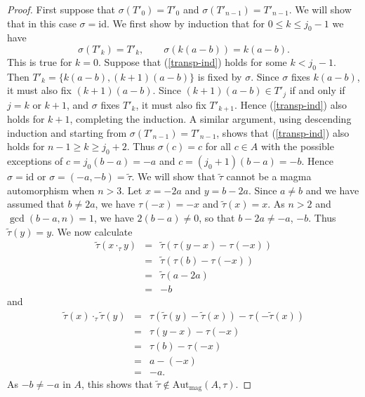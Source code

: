 \documentclass[10pt,a4paper]{amsart}
\numberwithin{equation}{section}
\theoremstyle{definition}
\newcommand{\id}{\mathrm{id}}
\newcommand{\Autmag}{\mathrm{Aut}_\mathrm{mag}}
\newcommand{\ttau}{\tilde{\tau}}
\begin{document}
\begin{proof}
First suppose that $\sigma(T'_0)=T'_0$ and $\sigma(T'_{n-1}) = T'_{n-1}$. We will show that in this case $\sigma=\id$.
We first show by induction that for $0 \leq k \leq j_0-1$ we have 
\begin{equation} \label{transp-ind}
	\sigma(T'_k)=T'_k, \qquad \sigma(k(a-b))=k(a-b).
\end{equation}
This is true for $k=0$. Suppose that (\ref{transp-ind}) holds for some $k<j_0-1$. Then $T'_k=\{k(a-b),(k+1)(a-b)\}$ is fixed by $\sigma$. Since $\sigma$ fixes $k(a-b)$, it must also fix $(k+1)(a-b)$. Since $(k+1)(a-b) \in T'_j$ if and only if $j=k$ or $k+1$, and $\sigma$ fixes $T'_k$, it must also fix $T'_{k+1}$. Hence (\ref{transp-ind}) also holds for $k+1$, completing the induction. A similar argument, using descending induction and starting from $\sigma(T'_{n-1})=T'_{n-1}$, shows that (\ref{transp-ind}) also holds for $n-1 \geq k \geq j_0+2$. Thus $\sigma(c)=c$ for all $c \in A$ with the possible exceptions of $c=j_0(b-a)=-a$ and $c=(j_0+1)(b-a)=-b$. Hence $\sigma=\id$ or $\sigma=(-a,-b)=\ttau$. We will show that $\ttau$ cannot be a magma automorphism when $n>3$. Let $x=-2a$ and $y=b-2a$. Since $a \neq b$ and we have assumed that $b \neq 2a$, we have $\tau(-x)=-x$ and $\ttau(x)=x$. As $n>2$ and $\gcd(b-a,n)=1$, we have $2(b-a) \neq 0$, so that $b-2a \neq -a$, $-b$. Thus $\ttau(y)=y$. We now calculate
\begin{eqnarray*}
	 \ttau( x \cdot_\tau y) & = & \ttau(\tau(y-x)-\tau(-x)) \\
	                         & = & \ttau(\tau(b)-\tau(-x)) \\
	                         & = & \ttau(a-2a) \\
	                         & = & -b
\end{eqnarray*}
and
\begin{eqnarray*}
	\ttau(x) \cdot_\tau \ttau(y) & = & \tau( \ttau(y)-\ttau(x)) - \tau( -\ttau(x)) \\ 
								& = & \tau(y-x) - \tau(-x) \\
								& = & \tau(b)-\tau(-x) \\
								& = & a -(-x) \\
								& = & -a.						
\end{eqnarray*}        
As $-b \neq -a$ in $A$, this shows that $\ttau \not \in \Autmag(A,\tau)$.


\end{proof}
\end{document}
